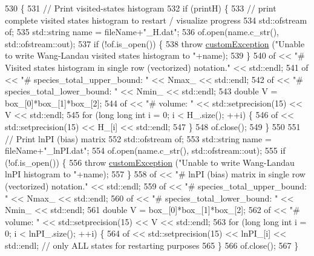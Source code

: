 \begin{DoxyCode}
530                                                        \{
531     \textcolor{comment}{// Print visited-states histogram}
532     \textcolor{keywordflow}{if} (printH) \{
533         \textcolor{comment}{// print complete visited states histogram to restart / visualize progress}
534         std::ofstream of;
535         std::string name = fileName+\textcolor{stringliteral}{"\_H.dat"};
536         of.open(name.c\_str(), std::ofstream::out);
537         \textcolor{keywordflow}{if} (!of.is\_open()) \{
538             \textcolor{keywordflow}{throw} \hyperlink{classcustom_exception}{customException} (\textcolor{stringliteral}{"Unable to write Wang-Landau visited states histogram to 
      "}+name);
539         \}
540         of << \textcolor{stringliteral}{"# Visited states histogram in single row (vectorized) notation."} << std::endl;
541         of << \textcolor{stringliteral}{"# species\_total\_upper\_bound: "} << Nmax\_ << std::endl;
542         of << \textcolor{stringliteral}{"# species\_total\_lower\_bound: "} << Nmin\_ << std::endl;
543         \textcolor{keywordtype}{double} V = box\_[0]*box\_[1]*box\_[2];
544         of << \textcolor{stringliteral}{"# volume: "} << std::setprecision(15) << V << std::endl;
545         \textcolor{keywordflow}{for} (\textcolor{keywordtype}{long} \textcolor{keywordtype}{long} \textcolor{keywordtype}{int} i = 0; i < H\_.size(); ++i) \{
546             of << std::setprecision(15) << H\_[i] << std::endl;
547         \}
548         of.close();
549     \}
550 
551     \textcolor{comment}{// Print lnPI (bias) matrix}
552     std::ofstream of;
553     std::string name = fileName+\textcolor{stringliteral}{"\_lnPI.dat"};
554     of.open(name.c\_str(), std::ofstream::out);
555     \textcolor{keywordflow}{if} (!of.is\_open()) \{
556         \textcolor{keywordflow}{throw} \hyperlink{classcustom_exception}{customException} (\textcolor{stringliteral}{"Unable to write Wang-Landau lnPI histogram to "}+name);
557     \}
558     of << \textcolor{stringliteral}{"# lnPI (bias) matrix in single row (vectorized) notation."} << std::endl;
559     of << \textcolor{stringliteral}{"# species\_total\_upper\_bound: "} << Nmax\_ << std::endl;
560     of << \textcolor{stringliteral}{"# species\_total\_lower\_bound: "} << Nmin\_ << std::endl;
561     \textcolor{keywordtype}{double} V = box\_[0]*box\_[1]*box\_[2];
562     of << \textcolor{stringliteral}{"# volume: "} << std::setprecision(15) << V << std::endl;
563     \textcolor{keywordflow}{for} (\textcolor{keywordtype}{long} \textcolor{keywordtype}{long} \textcolor{keywordtype}{int} i = 0; i < lnPI\_.size(); ++i) \{
564         of << std::setprecision(15) << lnPI\_[i] << std::endl; \textcolor{comment}{// only ALL states for restarting purposes}
565     \}
566     of.close();
567 \}
\end{DoxyCode}
